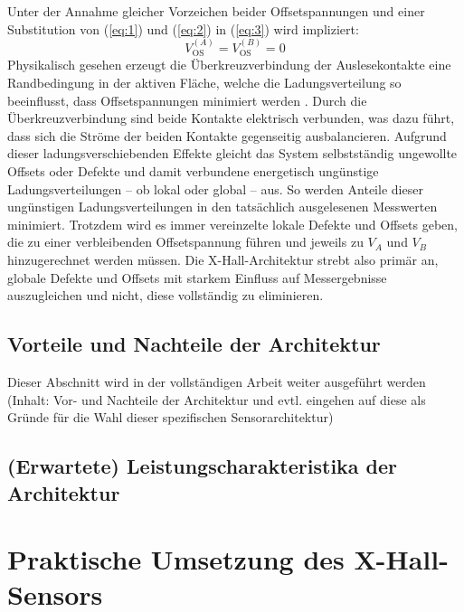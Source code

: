 \documentclass[12pt, a4paper]{article}
\begin{document}
Unter der Annahme gleicher Vorzeichen beider Offsetspannungen und einer Substitution von (\ref{eq:1}) und (\ref{eq:2}) in (\ref{eq:3}) wird  impliziert:
\begin{equation}
	V_\mathrm{OS}^{(A)}=V_\mathrm{OS}^{(B)}=0
	\label{eq:4}
\end{equation}
Physikalisch gesehen erzeugt die Überkreuzverbindung der Auslesekontakte eine  Randbedingung in der aktiven Fläche, welche die Ladungsverteilung so beeinflusst, dass Offsetspannungen minimiert werden \cite{cres21}. 
Durch die Überkreuzverbindung sind beide Kontakte elektrisch verbunden, was dazu führt, dass sich die Ströme der beiden Kontakte gegenseitig ausbalancieren. %
Aufgrund dieser ladungsverschiebenden Effekte gleicht das System selbstständig ungewollte Offsets oder Defekte und damit verbundene energetisch ungünstige Ladungsverteilungen – ob lokal oder global – aus. %
So werden Anteile dieser ungünstigen Ladungsverteilungen in den tatsächlich ausgelesenen Messwerten minimiert.\newline
Trotzdem wird es immer vereinzelte lokale Defekte und Offsets geben, die zu einer verbleibenden Offsetspannung führen und jeweils zu $V_A$ und $V_B$ hinzugerechnet werden müssen. Die X-Hall-Architektur strebt also primär an, globale Defekte und Offsets mit starkem Einfluss auf Messergebnisse auszugleichen und nicht, diese vollständig zu eliminieren\cite{cres21}.

\subsection{Vorteile und Nachteile der Architektur}
\centering
Dieser Abschnitt wird in der vollständigen Arbeit weiter ausgeführt werden (Inhalt: Vor- und Nachteile der Architektur und evtl. eingehen auf diese als Gründe für die Wahl dieser spezifischen Sensorarchitektur)

\subsection{(Erwartete) Leistungscharakteristika der Architektur}


\section{Praktische Umsetzung des X-Hall-Sensors}
\end{document}
